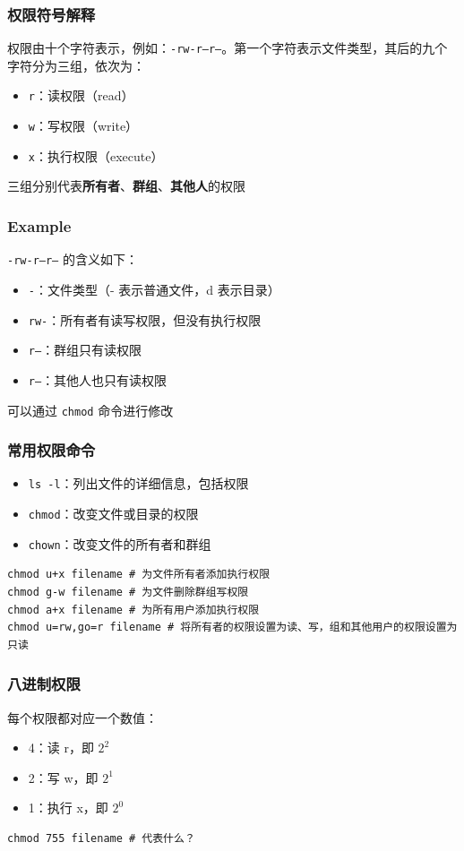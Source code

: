 \documentclass[UTF8, 16pt]{beamer}
\begin{document}
\begin{frame}
    \frametitle{权限符号解释}

    权限由十个字符表示，例如：\texttt{-rw-r--r--}。第一个字符表示文件类型，其后的九个字符分为三组，依次为：
    \begin{itemize}
        \item \texttt{r}：读权限（read）
        \item \texttt{w}：写权限（write）
        \item \texttt{x}：执行权限（execute）
    \end{itemize}
    三组分别代表\textbf{所有者}、\textbf{群组}、\textbf{其他人}的权限
\end{frame}

\begin{frame}
    \frametitle{Example}
    \textcolor{sufered}{\texttt{-rw-r--r--} 的含义如下：}

    \begin{itemize}
        \item \texttt{-}：文件类型（- 表示普通文件，d 表示目录）
        \item \texttt{rw-}：所有者有读写权限，但没有执行权限
        \item \texttt{r--}：群组只有读权限
        \item \texttt{r--}：其他人也只有读权限
    \end{itemize}
    可以通过 \texttt{chmod} 命令进行修改
\end{frame}

\begin{frame}[fragile]
    \frametitle{常用权限命令}

    \begin{itemize}
        \item \texttt{ls -l}：列出文件的详细信息，包括权限
        \item \texttt{chmod}：改变文件或目录的权限
        \item \texttt{chown}：改变文件的所有者和群组
    \end{itemize}
    \begin{lstlisting}
chmod u+x filename # 为文件所有者添加执行权限
chmod g-w filename # 为文件删除群组写权限
chmod a+x filename # 为所有用户添加执行权限
chmod u=rw,go=r filename # 将所有者的权限设置为读、写，组和其他用户的权限设置为只读\end{lstlisting}
\end{frame}

\begin{frame}[fragile]
    \frametitle{八进制权限}
    \textcolor{sufered}{每个权限都对应一个数值：}

    \begin{itemize}
        \item 4：读 r，即 $2^2$
        \item 2：写 w，即 $2^1$
        \item 1：执行 x，即 $2^0$
    \end{itemize}
    \begin{lstlisting}[numbers=none]
chmod 755 filename # 代表什么？\end{lstlisting}
\end{frame}
\end{document}
